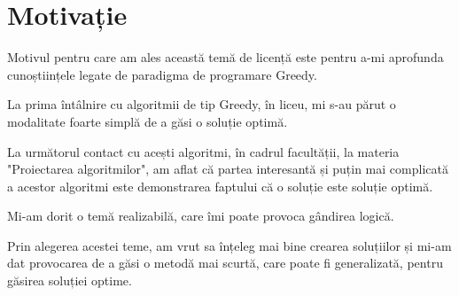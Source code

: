 \chapter*{Motivație} 

Motivul pentru care am ales această temă de licență este pentru a-mi aprofunda cunoștiințele legate de paradigma de programare Greedy. \par
La prima întâlnire cu algoritmii de tip Greedy, în liceu, mi s-au părut o modalitate foarte simplă de a găsi o soluție optimă. \par
La următorul contact cu acești algoritmi, în cadrul facultății, la materia "Proiectarea algoritmilor", 
 am aflat că partea interesantă și puțin mai complicată a acestor algoritmi este demonstrarea faptului că o soluție este soluție optimă. \par 
Mi-am dorit o temă realizabilă, care îmi poate provoca gândirea logică.\par
Prin  alegerea acestei teme, am vrut sa înțeleg mai bine crearea soluțiilor și
mi-am dat provocarea de a găsi o metodă mai scurtă, care poate fi generalizată, pentru găsirea soluției optime.
